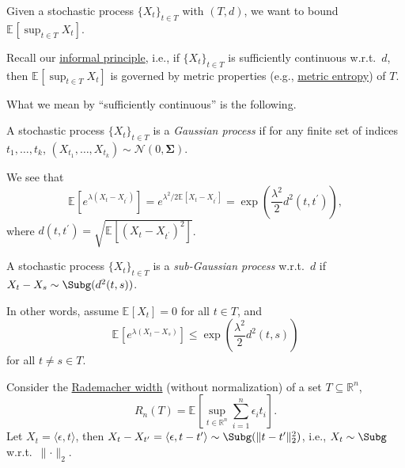 \begin{prev}
	Given a stochastic process \(\{ X_t \} _{t\in T}\) with \((T, d)\), we want to bound \(\mathbb{E}_{}\left[\sup _{t\in T} X_t \right] \).
\end{prev}

Recall our \hyperref[int:informal-principle]{informal principle}, i.e., if \(\{ X_t \} _{t\in T}\) is sufficiently continuous w.r.t.\ \(d\), then \(\mathbb{E}_{}\left[\sup _{t\in T} X_t\right] \) is governed by metric properties (e.g., \hyperref[def:metric-entropy]{metric entropy}) of \(T\).

What we mean by ``sufficiently continuous'' is the following.

\begin{definition}\label{def:Gaussian-process}
	A stochastic process \(\{ X_t \} _{t\in T}\) is a \emph{Gaussian process} if for any finite set of indices \({t_1, \dots , t_k}\), \((X_{t_1}, \dots , X_{t_k}) \sim \mathcal{N} (0, \mathbf{\Sigma} ) \).
\end{definition}

We see that
\[
	\mathbb{E}_{}\left[e^{\lambda (X_t - X_{t^{\prime} })} \right]
	= e^{\lambda ^2 / 2 \mathbb{E}_{}\left[X_t - X_{t^{\prime} } \right] }
	= \exp \left( \frac{\lambda ^2}{2} d^2(t, t^{\prime} ) \right),
\]
where \(d(t, t^{\prime} ) = \sqrt{\mathbb{E}_{}\left[ (X_t - X_{t^{\prime} })^2 \right]}\).

\begin{definition}\label{def:sub-Gaussian-process}
	A stochastic process \(\{ X_t \} _{t\in T}\) is a \emph{sub-Gaussian process} w.r.t.\ \(d\) if \(X_t - X_s \sim \Subg(d^2(t, s))\).
\end{definition}

In other words, assume \(\mathbb{E}_{}\left[X_t \right] = 0\) for all \(t\in T\), and
\[
	\mathbb{E}_{}\left[e^{\lambda (X_t - X_s)} \right]
	\leq \exp \left( \frac{\lambda ^2}{2} d^2(t, s) \right)
\]
for all \(t \neq s\in T\).

\begin{eg}\label{eg:Rademacher-process}
	Consider the \hyperref[def:Rademacher-width]{Rademacher width} (without normalization) of a set \(T \subseteq \mathbb{R} ^n\),
	\[
		R_n(T) = \mathbb{E}_{}\left[\sup _{t\in \mathbb{R} ^n} \sum_{i=1}^{n} \epsilon _i t_i \right] .
	\]
	Let \(X_t = \langle \epsilon , t \rangle \), then \(X_t - X_{t^{\prime} } = \langle \epsilon , t-t^{\prime}  \rangle \sim \Subg(\lVert t - t^{\prime}  \rVert_2^2 )\), i.e., \(X_t \sim \Subg\) w.r.t.\ \(\lVert \cdot \rVert _2\).
\end{eg}

